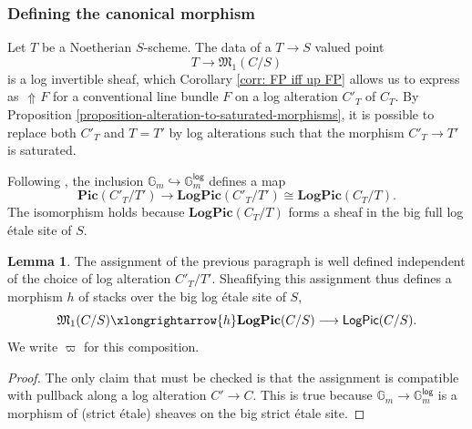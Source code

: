 \documentclass[11pt]{amsart}
\theoremstyle{definition}
\theoremstyle{definition}
\newtheorem{lemma}[theorem]{Lemma}
\DeclareMathOperator{\arrowup}{\!\Uparrow \!}
\begin{document}
\subsubsection{Defining the canonical morphism}
Let $T$ be a Noetherian $S$-scheme. The data of a $T\rightarrow S$ valued point $$T\longrightarrow \mathfrak{M}_1(C/S)$$
is a log invertible sheaf, which Corollary \ref{corr: FP iff up FP} allows us to express as $\arrowup F$ for a conventional line bundle $F$ on a log alteration $C'_T$ of $C_T$.
By Proposition \ref{proposition-alteration-to-saturated-morphisms}, it is possible to replace both $C'_T$ and $T=T'$ by log alterations such that the morphism $C'_T\rightarrow T'$ is saturated.

Following \cite[Section 4.11]{MolchoWise}, the inclusion $\mathbb{G}_m\hookrightarrow \mathbb{G}_m^\mathsf{log}$ defines a map $$\mathbf{Pic}(C'_T/T')\longrightarrow \mathbf{LogPic}(C'_T/T')\cong \mathbf{LogPic}(C_T/T).$$ The isomorphism holds because $\mathbf{LogPic}(C_T/T)$ forms a sheaf in the big full log \'etale site of $S$. 

\begin{lemma}
    The assignment of the previous paragraph is well defined independent of the choice of log alteration $C'_T/T'$. Sheafifying this assignment thus defines a morphism $h$ of stacks over the big log \'etale site of $S$, $$\mathfrak{M}_1(C/S)\xlongrightarrow{h} \mathbf{LogPic}(C/S)\longrightarrow \ensuremath{\text{\sffamily\upshape LogPic}}(C/S).$$
    We write $\varpi$ for this composition.
\end{lemma}
\begin{proof}
    The only claim that must be checked is that the assignment is compatible with pullback along a log alteration $C'\rightarrow C$. This is true because $\mathbb{G}_m\rightarrow \mathbb{G}_m^\mathsf{log}$ is a morphism of (strict \'etale) sheaves on the big strict \'etale site.
\end{proof}
\end{document}
